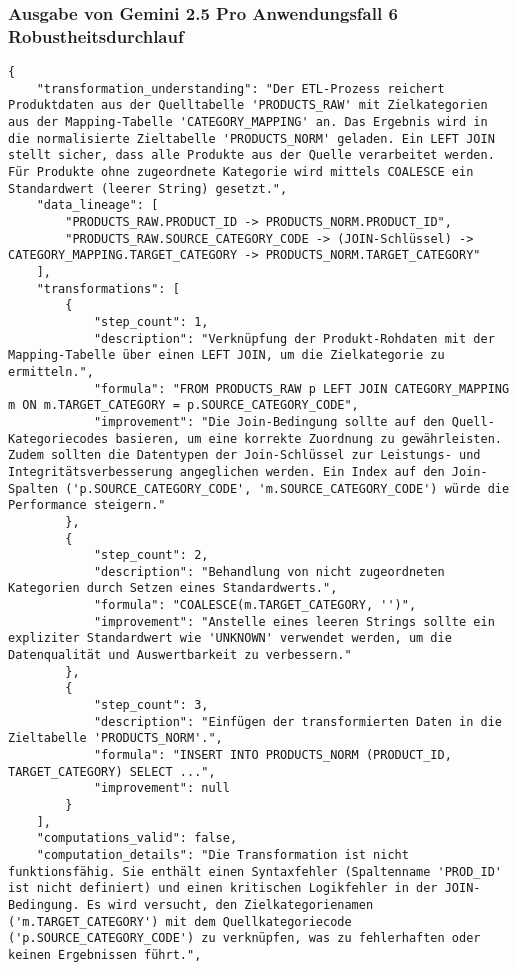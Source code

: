 \subsubsection{Ausgabe von Gemini 2.5 Pro Anwendungsfall 6 Robustheitsdurchlauf}\label{anhang:subsubsec:gemini_case6_prompt3}
\begin{lstlisting}[caption={Ausgabe: Gemini 2.5 Pro Anwendungsfall 6 Robustheitsdurchlauf},label={gemini_case6_prompt3}]
{
    "transformation_understanding": "Der ETL-Prozess reichert Produktdaten aus der Quelltabelle 'PRODUCTS_RAW' mit Zielkategorien aus der Mapping-Tabelle 'CATEGORY_MAPPING' an. Das Ergebnis wird in die normalisierte Zieltabelle 'PRODUCTS_NORM' geladen. Ein LEFT JOIN stellt sicher, dass alle Produkte aus der Quelle verarbeitet werden. Für Produkte ohne zugeordnete Kategorie wird mittels COALESCE ein Standardwert (leerer String) gesetzt.",
    "data_lineage": [
        "PRODUCTS_RAW.PRODUCT_ID -> PRODUCTS_NORM.PRODUCT_ID",
        "PRODUCTS_RAW.SOURCE_CATEGORY_CODE -> (JOIN-Schlüssel) -> CATEGORY_MAPPING.TARGET_CATEGORY -> PRODUCTS_NORM.TARGET_CATEGORY"
    ],
    "transformations": [
        {
            "step_count": 1,
            "description": "Verknüpfung der Produkt-Rohdaten mit der Mapping-Tabelle über einen LEFT JOIN, um die Zielkategorie zu ermitteln.",
            "formula": "FROM PRODUCTS_RAW p LEFT JOIN CATEGORY_MAPPING m ON m.TARGET_CATEGORY = p.SOURCE_CATEGORY_CODE",
            "improvement": "Die Join-Bedingung sollte auf den Quell-Kategoriecodes basieren, um eine korrekte Zuordnung zu gewährleisten. Zudem sollten die Datentypen der Join-Schlüssel zur Leistungs- und Integritätsverbesserung angeglichen werden. Ein Index auf den Join-Spalten ('p.SOURCE_CATEGORY_CODE', 'm.SOURCE_CATEGORY_CODE') würde die Performance steigern."
        },
        {
            "step_count": 2,
            "description": "Behandlung von nicht zugeordneten Kategorien durch Setzen eines Standardwerts.",
            "formula": "COALESCE(m.TARGET_CATEGORY, '')",
            "improvement": "Anstelle eines leeren Strings sollte ein expliziter Standardwert wie 'UNKNOWN' verwendet werden, um die Datenqualität und Auswertbarkeit zu verbessern."
        },
        {
            "step_count": 3,
            "description": "Einfügen der transformierten Daten in die Zieltabelle 'PRODUCTS_NORM'.",
            "formula": "INSERT INTO PRODUCTS_NORM (PRODUCT_ID, TARGET_CATEGORY) SELECT ...",
            "improvement": null
        }
    ],
    "computations_valid": false,
    "computation_details": "Die Transformation ist nicht funktionsfähig. Sie enthält einen Syntaxfehler (Spaltenname 'PROD_ID' ist nicht definiert) und einen kritischen Logikfehler in der JOIN-Bedingung. Es wird versucht, den Zielkategorienamen ('m.TARGET_CATEGORY') mit dem Quellkategoriecode ('p.SOURCE_CATEGORY_CODE') zu verknüpfen, was zu fehlerhaften oder keinen Ergebnissen führt.",

\end{lstlisting}
